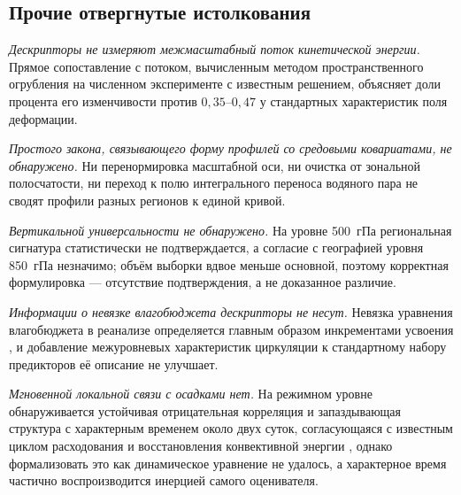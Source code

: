 \documentclass[11pt,a4paper]{article}
\begin{document}
\subsection{Прочие отвергнутые истолкования}

\emph{Дескрипторы не измеряют межмасштабный поток кинетической энергии.} Прямое сопоставление с потоком, вычисленным методом пространственного огрубления \cite{Germano1992,Aluie2018} на численном эксперименте с известным решением, объясняет доли процента его изменчивости против $0{,}35$--$0{,}47$ у стандартных характеристик поля деформации.

\emph{Простого закона, связывающего форму профилей со средовыми ковариатами, не обнаружено.} Ни перенормировка масштабной оси, ни очистка от зональной полосчатости, ни переход к полю интегрального переноса водяного пара не сводят профили разных регионов к единой кривой.

\emph{Вертикальной универсальности не обнаружено.} На уровне 500~гПа региональная сигнатура статистически не подтверждается, а согласие с географией уровня 850~гПа незначимо; объём выборки вдвое меньше основной, поэтому корректная формулировка --- отсутствие подтверждения, а не доказанное различие.

\emph{Информации о невязке влагобюджета дескрипторы не несут.} Невязка уравнения влагобюджета в реанализе определяется главным образом инкрементами усвоения \cite{Trenberth1991,Mayer2021}, и добавление межуровневых характеристик циркуляции к стандартному набору предикторов её описание не улучшает.

\emph{Мгновенной локальной связи с осадками нет.} На режимном уровне обнаруживается устойчивая отрицательная корреляция и запаздывающая структура с характерным временем около двух суток, согласующаяся с известным циклом расходования и восстановления конвективной энергии \cite{Masunaga2012,PetersNeelin2006}, однако формализовать это как динамическое уравнение не удалось, а характерное время частично воспроизводится инерцией самого оценивателя.
\end{document}
